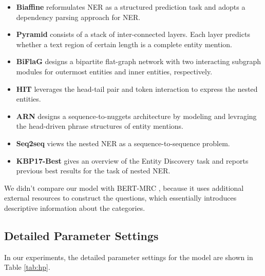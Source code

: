 \documentclass[11pt,a4paper]{article}
\begin{document}
\begin{itemize}
    \item \textbf{Biaffine} \citep{yu-etal-2020-named} reformulates NER as a structured prediction task and adopts a dependency parsing approach for NER.
    \item \textbf{Pyramid} \citep{wang-etal-2020-pyramid} consists of a stack of inter-connected layers. Each layer predicts whether a text region of certain length is a complete entity mention.
    \item \textbf{BiFlaG} \citep{yu-etal-2020-named} designs a bipartite flat-graph network with two interacting subgraph modules for outermost entities and inner entities, respectively.
\item \textbf{HIT} \citep{wang-etal-2020-hit} leverages the head-tail pair and token interaction to express the nested entities.
    \item \textbf{ARN} \citep{lin-etal-2019-sequence} designs a sequence-to-nuggets architecture by modeling and levraging the head-driven phrase structures of entity mentions.
\item \textbf{Seq2seq} \citep{strakova-etal-2019-neural} views the nested NER as a sequence-to-sequence problem.
\item \textbf{KBP17-Best} \citep{DBLP:conf/tac/JiPZNMMC17} gives an overview of the Entity Discovery task and reports previous best results for the task of nested NER.
\end{itemize}

We didn't compare our model with BERT-MRC \citep{li-etal-2020-unified}, because it uses additional external resources to construct the questions, which essentially introduces descriptive information about the categories. 




\subsection{Detailed Parameter Settings}

In our experiments, the detailed parameter settings for the model are shown in Table \ref{tab:hp}.
\end{document}
